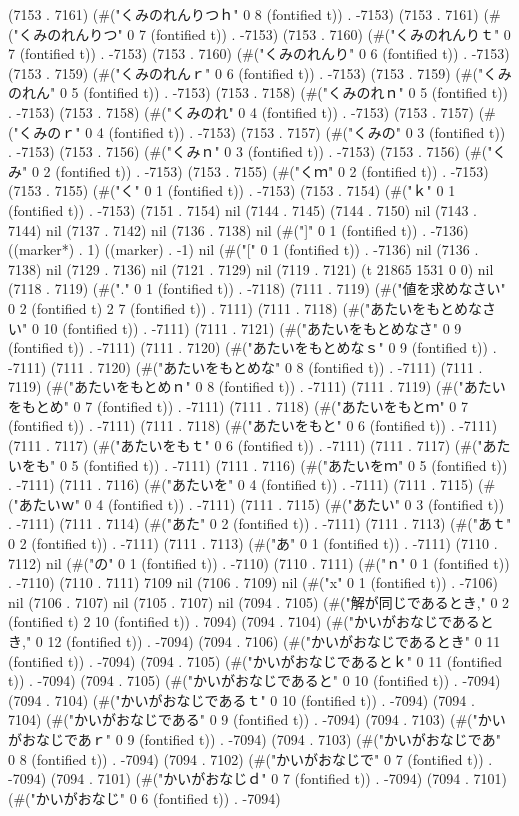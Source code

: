 (7153 . 7161) (#("くみのれんりつｈ" 0 8 (fontified t)) . -7153) (7153 . 7161) (#("くみのれんりつ" 0 7 (fontified t)) . -7153) (7153 . 7160) (#("くみのれんりｔ" 0 7 (fontified t)) . -7153) (7153 . 7160) (#("くみのれんり" 0 6 (fontified t)) . -7153) (7153 . 7159) (#("くみのれんｒ" 0 6 (fontified t)) . -7153) (7153 . 7159) (#("くみのれん" 0 5 (fontified t)) . -7153) (7153 . 7158) (#("くみのれｎ" 0 5 (fontified t)) . -7153) (7153 . 7158) (#("くみのれ" 0 4 (fontified t)) . -7153) (7153 . 7157) (#("くみのｒ" 0 4 (fontified t)) . -7153) (7153 . 7157) (#("くみの" 0 3 (fontified t)) . -7153) (7153 . 7156) (#("くみｎ" 0 3 (fontified t)) . -7153) (7153 . 7156) (#("くみ" 0 2 (fontified t)) . -7153) (7153 . 7155) (#("くｍ" 0 2 (fontified t)) . -7153) (7153 . 7155) (#("く" 0 1 (fontified t)) . -7153) (7153 . 7154) (#("ｋ" 0 1 (fontified t)) . -7153) (7151 . 7154) nil (7144 . 7145) (7144 . 7150) nil (7143 . 7144) nil (7137 . 7142) nil (7136 . 7138) nil (#("]" 0 1 (fontified t)) . -7136) ((marker*) . 1) ((marker) . -1) nil (#("[" 0 1 (fontified t)) . -7136) nil (7136 . 7138) nil (7129 . 7136) nil (7121 . 7129) nil (7119 . 7121) (t 21865 1531 0 0) nil (7118 . 7119) (#("." 0 1 (fontified t)) . -7118) (7111 . 7119) (#("値を求めなさい" 0 2 (fontified t) 2 7 (fontified t)) . 7111) (7111 . 7118) (#("あたいをもとめなさい" 0 10 (fontified t)) . -7111) (7111 . 7121) (#("あたいをもとめなさ" 0 9 (fontified t)) . -7111) (7111 . 7120) (#("あたいをもとめなｓ" 0 9 (fontified t)) . -7111) (7111 . 7120) (#("あたいをもとめな" 0 8 (fontified t)) . -7111) (7111 . 7119) (#("あたいをもとめｎ" 0 8 (fontified t)) . -7111) (7111 . 7119) (#("あたいをもとめ" 0 7 (fontified t)) . -7111) (7111 . 7118) (#("あたいをもとｍ" 0 7 (fontified t)) . -7111) (7111 . 7118) (#("あたいをもと" 0 6 (fontified t)) . -7111) (7111 . 7117) (#("あたいをもｔ" 0 6 (fontified t)) . -7111) (7111 . 7117) (#("あたいをも" 0 5 (fontified t)) . -7111) (7111 . 7116) (#("あたいをｍ" 0 5 (fontified t)) . -7111) (7111 . 7116) (#("あたいを" 0 4 (fontified t)) . -7111) (7111 . 7115) (#("あたいｗ" 0 4 (fontified t)) . -7111) (7111 . 7115) (#("あたい" 0 3 (fontified t)) . -7111) (7111 . 7114) (#("あた" 0 2 (fontified t)) . -7111) (7111 . 7113) (#("あｔ" 0 2 (fontified t)) . -7111) (7111 . 7113) (#("あ" 0 1 (fontified t)) . -7111) (7110 . 7112) nil (#("の" 0 1 (fontified t)) . -7110) (7110 . 7111) (#("ｎ" 0 1 (fontified t)) . -7110) (7110 . 7111) 7109 nil (7106 . 7109) nil (#("x" 0 1 (fontified t)) . -7106) nil (7106 . 7107) nil (7105 . 7107) nil (7094 . 7105) (#("解が同じであるとき," 0 2 (fontified t) 2 10 (fontified t)) . 7094) (7094 . 7104) (#("かいがおなじであるとき," 0 12 (fontified t)) . -7094) (7094 . 7106) (#("かいがおなじであるとき" 0 11 (fontified t)) . -7094) (7094 . 7105) (#("かいがおなじであるとｋ" 0 11 (fontified t)) . -7094) (7094 . 7105) (#("かいがおなじであると" 0 10 (fontified t)) . -7094) (7094 . 7104) (#("かいがおなじであるｔ" 0 10 (fontified t)) . -7094) (7094 . 7104) (#("かいがおなじである" 0 9 (fontified t)) . -7094) (7094 . 7103) (#("かいがおなじであｒ" 0 9 (fontified t)) . -7094) (7094 . 7103) (#("かいがおなじであ" 0 8 (fontified t)) . -7094) (7094 . 7102) (#("かいがおなじで" 0 7 (fontified t)) . -7094) (7094 . 7101) (#("かいがおなじｄ" 0 7 (fontified t)) . -7094) (7094 . 7101) (#("かいがおなじ" 0 6 (fontified t)) . -7094) 